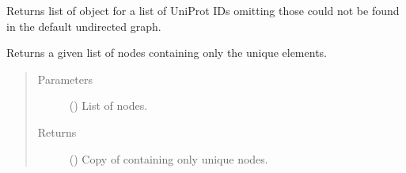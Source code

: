 \documentclass[letterpaper,10pt,english]{sphinxmanual}
\begin{document}
\begin{fulllineitems}
\begin{fulllineitems}
\begin{description}
\end{description}

\end{fulllineitems}


\begin{fulllineitems}
\label{\detokenize{reference:pypath.main.PyPath.uniprots}}
Returns list of  object
for a list of UniProt IDs omitting those
could not be found in the default
undirected graph.

\end{fulllineitems}


\begin{fulllineitems}
\label{\detokenize{reference:pypath.main.PyPath.uniq_node_list}}
Returns a given list of nodes containing only the unique
elements.
\begin{quote}\begin{description}
\item[{Parameters}] \leavevmode
{} () \textendash{} List of nodes.

\item[{Returns}] \leavevmode
() \textendash{} Copy of  containing only unique nodes.

\end{description}\end{quote}

\end{fulllineitems}


\begin{fulllineitems}
\label{\detokenize{reference:pypath.main.PyPath.uniq_ptm}}
\end{fulllineitems}


\end{fulllineitems}
\end{document}
